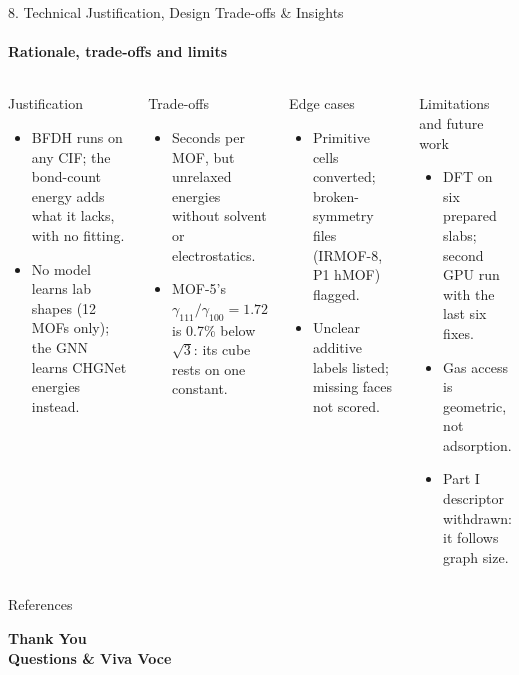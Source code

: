 \documentclass[aspectratio=169, 11pt]{beamer}
\begin{document}
\begin{frame}{8. Technical Justification, Design Trade-offs \& Insights}
    \framesubtitle{Rationale, trade-offs and limits}
    \begin{columns}[T]
        \begin{block}{Justification}
            \scriptsize
            \begin{itemize}
                \item BFDH runs on any CIF; the bond-count energy adds what it lacks, with no fitting.
                \item No model learns lab shapes (12 MOFs only); the GNN learns CHGNet energies instead.
            \end{itemize}
        \end{block}
        \begin{block}{Trade-offs}
            \scriptsize
            \begin{itemize}
                \item Seconds per MOF, but unrelaxed energies without solvent or electrostatics.
                \item MOF-5's $\gamma_{111}/\gamma_{100}=1.72$ is 0.7\% below $\sqrt3$: its cube rests on one constant.
            \end{itemize}
        \end{block}
        \begin{block}{Edge cases}
            \scriptsize
            \begin{itemize}
                \item Primitive cells converted; broken-symmetry files (IRMOF-8, P1 hMOF) flagged.
                \item Unclear additive labels listed; missing faces not scored.
            \end{itemize}
        \end{block}
        \begin{block}{Limitations and future work}
            \scriptsize
            \begin{itemize}
                \item DFT on six prepared slabs; second GPU run with the last six fixes.
                \item Gas access is geometric, not adsorption.
                \item Part I descriptor withdrawn: it follows graph size.
            \end{itemize}
        \end{block}
    \end{columns}
\end{frame}

\nocite{*}
\begin{frame}[allowframebreaks]{References}
    \tiny
    
    
\end{frame}

\begin{frame}
    \centering
    {\Huge \textbf{\textcolor{amritaMaroon}{Thank You}}} \\[0.4cm]
    {\large \textbf{Questions \& Viva Voce}}
\end{frame}
\end{document}
